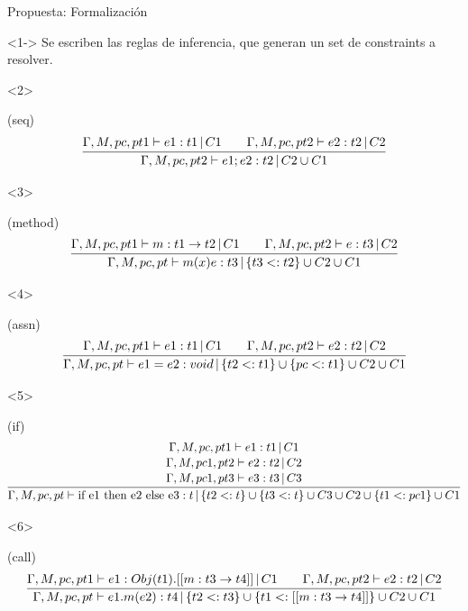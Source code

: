 \documentclass[aspectratio=169,10pt]{beamer}
\begin{document}
\begin{frame}[fragile]{Propuesta: Formalización}
  \begin{onlyenv}<1->
    Se escriben las reglas de inferencia, que generan un set de constraints a resolver.
  \end{onlyenv}
  \begin{onlyenv}<2>
    \begin{center}
      (seq)
      \[\infer{\Gamma, M, pc, pt2 \vdash e1;e2 : t2\, |\, C2 \cup C1}{\Gamma, M, pc, pt1 \vdash e1 : t1\, |\, C1 \qquad \Gamma, M, pc, pt2 \vdash e2 : t2\, |\, C2}\]
    \end{center}

  \end{onlyenv}

  \begin{onlyenv}<3>
    \begin{center}
      (method)
      \[\infer{\Gamma, M, pc, pt \vdash m(x)e : t3\, |\, \{t3 <: t2\} \cup C2 \cup C1}{\Gamma, M, pc, pt1 \vdash m : t1 \rightarrow t2\, |\, C1 \qquad \Gamma, M, pc, pt2 \vdash e : t3\, |\, C2}\]
    \end{center}

  \end{onlyenv}

  \begin{onlyenv}<4>
    \begin{center}
      (assn)
      \[\infer{\Gamma, M, pc, pt \vdash e1 = e2 : void\, |\, \{t2 <: t1\} \cup \{pc <: t1\} \cup C2 \cup C1}{\Gamma, M, pc, pt1 \vdash e1 : t1\, |\, C1 \qquad \Gamma, M, pc, pt2 \vdash e2 : t2\, |\, C2}\]
    \end{center}
  \end{onlyenv}

  \begin{onlyenv}<5>
    \begin{center}
      (if)
      \[\infer{\Gamma, M, pc, pt \vdash \text{if e1 then e2 else e3} : t\, |\, \{t2 <: t\} \cup \{t3 <: t\} \cup C3 \cup C2 \cup \{t1 <: pc1\} \cup C1}{\stackanchor{$\Gamma, M, pc, pt1 \vdash e1 : t1\, |\, C1$}{\stackanchor{$\Gamma, M, pc1, pt2 \vdash e2 : t2\, |\, C2$}{$\Gamma, M, pc1, pt3 \vdash e3 : t3\, |\, C3$}}}\]
    \end{center}
  \end{onlyenv}

  \begin{onlyenv}<6>
    \begin{center}
      (call)
      \[\infer{\Gamma, M, pc, pt \vdash e1.m(e2) : t4\, |\, \{t2 <: t3\} \cup \{t1 <: [[m: t3 \rightarrow t4]]\} \cup C2 \cup C1}{\Gamma, M, pc, pt1 \vdash e1 : Obj(t1). [[m : t3 \rightarrow t4]]\, |\, C1 \qquad \Gamma, M, pc, pt2 \vdash e2 : t2\, |\, C2}\]
    \end{center}
  \end{onlyenv}
\end{frame}
\end{document}
